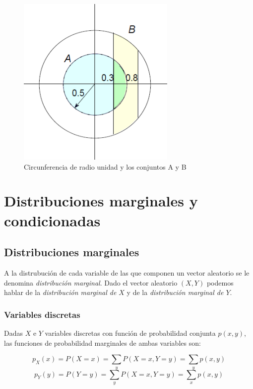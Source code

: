 \documentclass{article}
\begin{document}
\begin{figure}[htbp]
    \center
    \includegraphics[scale=0.6]{img/Ejemplo2.png}
    \caption{Circunferencia de radio unidad y los conjuntos A y B}
\end{figure}


\section{Distribuciones marginales y condicionadas}


\subsection{Distribuciones marginales}

A la distrubución de cada variable de las que componen un vector aleatorio se le denomina \textit{distribución marginal}.
Dado el vector aleatorio $(X, Y)$ podemos hablar de la \textit{distribución marginal de $X$} y de la \textit{distribución marginal de $Y$}. \\
\subsubsection{Variables discretas} 
Dadas $X$ e $Y$ variables discretas con función de probabilidad conjunta $p(x, y)$, las funciones de probabilidad 
marginales de ambas variables son:

\[ p_{X}(x) = P(X = x) = \sum_{y}P(X = x, Y = y) = \sum_{y}p(x, y) \]
\[ p_{Y}(y) = P(Y = y) = \sum_{y}P(X = x, Y = y) = \sum_{x}p(x, y) \] 
\end{document}

